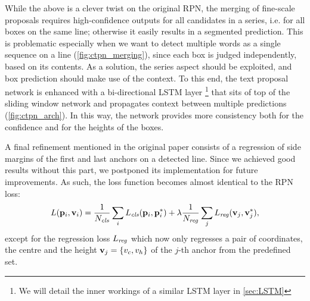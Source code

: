 		While the above is a clever twist on the original RPN, the merging of fine-scale proposals requires high-confidence outputs for all candidates in a series, i.e. for all boxes on the same line; otherwise it easily results in a segmented prediction. This is problematic especially when we want to detect multiple words as a single sequence on a line (\autoref{fig:ctpn_merging}), since each box is judged independently, based on its contents. As a solution, the series aspect should be exploited, and box prediction should make use of the context. To this end, the text proposal network is enhanced with a bi-directional LSTM layer
			\footnote{We will detail the inner workings of a similar LSTM layer in \autoref{sec:LSTM}}
		that sits of top of the sliding window network and propagates context between multiple predictions (\autoref{fig:ctpn_arch}). In this way, the network provides more consistency both for the confidence and for the heights of the boxes.

		A final refinement mentioned in the original paper consists of a regression of side margins of the first and last anchors on a detected line. Since we achieved good results without this part, we postponed its implementation for future improvements. As such, the loss function becomes almost identical to the RPN loss:
		\begin{equation*}\label{eq:rpn_loss}
		L(\mathbf{p}_i, \mathbf{v}_i) =
			\frac{1}{N_{\mathit{cls}}}\sum_i L_{\mathit{cls}}(\mathbf{p}_i, \mathbf{p}^{*}_i)
			+ \lambda\frac{1}{N_{\mathit{reg}}}\sum_j L_{\mathit{reg}}(\mathbf{v}_j, \mathbf{v}^{*}_j),
		\end{equation*}
		except for the regression loss \(L_{\mathit{reg}}\) which now only regresses a pair of coordinates, the centre and the height \(\mathbf{v}_j = \{v_c, v_h\}\) of the \(j\)-th anchor from the predefined set.


